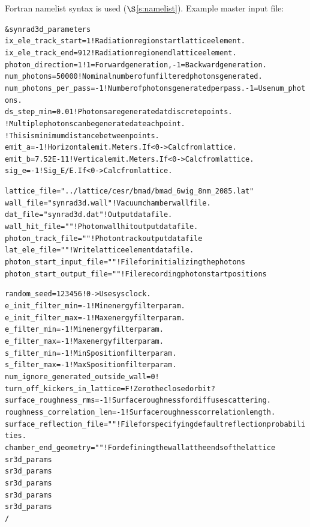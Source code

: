 \documentclass[11pt,openany]{report}
\newcommand{\sref}[1]{$\S$\ref{#1}}
\newlength{\ExBeg}
\newlength{\ExEnd}
\newenvironment{example}
  {\vspace{\ExBeg} \begin{alltt}}
  {\end{alltt} \vspace{\ExEnd}}
\begin{document}
Fortran namelist syntax is used (\sref{s:namelist}). Example master input file:
\begin{example}
  &synrad3d_parameters
    ix_ele_track_start   = 1      ! Radiation region start lattice element.
    ix_ele_track_end     = 912    ! Radiation region end lattice element.
    photon_direction     = 1      ! 1 = Forward generation, -1 = Backward generation.
    num_photons          = 50000  ! Nominal number of unfiltered photons generated. 
    num_photons_per_pass = -1     ! Number of photons generated per pass. -1 = Use num_photons.
    ds_step_min          = 0.01   ! Photons are generated at discrete points. 
                              ! Multiple photons can be generated at each point.
                              ! This is minimum distance between points.
    emit_a       = -1         ! Horizontal emit. Meters. If < 0 -> Calc from lattice.
    emit_b       = 7.52E-11   ! Vertical emit.  Meters. If < 0 -> Calc from lattice.
    sig_e        = -1         ! Sig_E/E. If < 0 -> Calc from lattice.

    lattice_file = "../lattice/cesr/bmad/bmad_6wig_8nm_2085.lat" 
    wall_file    = "synrad3d.wall"   ! Vacuum chamber wall file.
    dat_file     = "synrad3d.dat"    ! Output data file.
    wall_hit_file = ""               ! Photon wall hit output data file.
    photon_track_file = ""           ! Photon track output data file
    lat_ele_file  = ""               ! Write lattice element data file.
    photon_start_input_file  = ""    ! File for initializing the photons
    photon_start_output_file = ""    ! File recording photon start positions

    random_seed = 123456             ! 0 -> Use sys clock.
    e_init_filter_min = -1           ! Min energy filter param.
    e_init_filter_max = -1           ! Max energy filter param.
    e_filter_min = -1                ! Min energy filter param.
    e_filter_max = -1                ! Max energy filter param.
    s_filter_min = -1                ! Min S position filter param.
    s_filter_max = -1                ! Max S position filter param.
    num_ignore_generated_outside_wall = 0    !
    turn_off_kickers_in_lattice = F          ! Zero the closed orbit?
    surface_roughness_rms       = -1         ! Surface roughness for diffuse scattering.
    roughness_correlation_len   = -1         ! Surface roughness correlation length.
    surface_reflection_file     = ""         ! File for specifying default reflection probabilities.
    chamber_end_geometry = ""                   ! For defining the wall at the ends of the lattice
    sr3d_params%
    sr3d_params%
    sr3d_params%
    sr3d_params%
    sr3d_params%
  /
\end{example}
\end{document}
